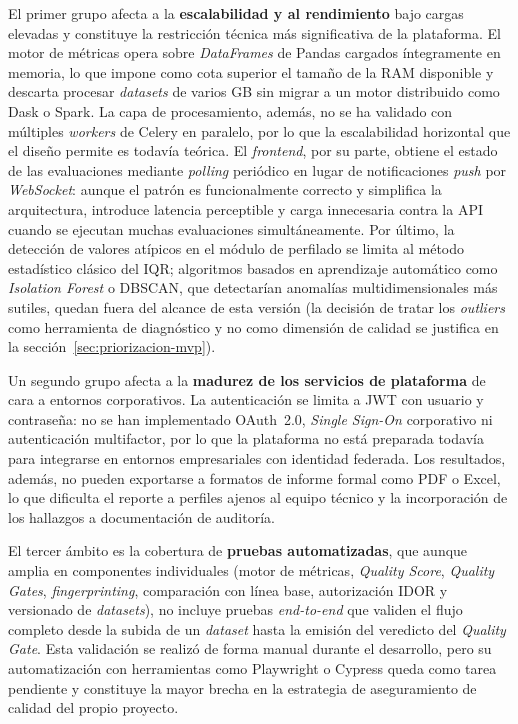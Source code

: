 El primer grupo afecta a la \textbf{escalabilidad y al rendimiento} bajo
cargas elevadas y constituye la restricción técnica más significativa de
la plataforma.  El motor de métricas opera sobre \emph{DataFrames} de
Pandas cargados íntegramente en memoria, lo que impone como cota
superior el tamaño de la RAM disponible y descarta procesar
\emph{datasets} de varios GB sin migrar a un motor distribuido como Dask
o Spark.  La capa de procesamiento, además, no se ha validado con
múltiples \emph{workers} de Celery en paralelo, por lo que la
escalabilidad horizontal que el diseño permite es todavía teórica.  El
\emph{frontend}, por su parte, obtiene el estado de las evaluaciones
mediante \emph{polling} periódico en lugar de notificaciones \emph{push}
por \emph{WebSocket}: aunque el patrón es funcionalmente correcto y
simplifica la arquitectura, introduce latencia perceptible y carga
innecesaria contra la \ac{API} cuando se ejecutan muchas evaluaciones
simultáneamente.  Por último, la detección de valores atípicos en el
módulo de perfilado se limita al método estadístico clásico del
\ac{IQR}; algoritmos basados en aprendizaje automático como
\emph{Isolation Forest} o \ac{DBSCAN}, que detectarían anomalías
multidimensionales más sutiles, quedan fuera del alcance de esta versión
(la decisión de tratar los \emph{outliers} como herramienta de
diagnóstico y no como dimensión de calidad se justifica en la
sección~\ref{sec:priorizacion-mvp}).

Un segundo grupo afecta a la \textbf{madurez de los servicios de
plataforma} de cara a entornos corporativos.  La autenticación se limita
a \ac{JWT} con usuario y contraseña: no se han implementado OAuth~2.0,
\emph{Single Sign-On} corporativo ni autenticación multifactor, por lo
que la plataforma no está preparada todavía para integrarse en entornos
empresariales con identidad federada.  Los resultados, además, no pueden
exportarse a formatos de informe formal como \ac{PDF} o Excel, lo que
dificulta el reporte a perfiles ajenos al equipo técnico y la
incorporación de los hallazgos a documentación de auditoría.

El tercer ámbito es la cobertura de \textbf{pruebas automatizadas}, que
aunque amplia en componentes individuales (motor de métricas,
\emph{Quality Score}, \emph{Quality Gates}, \emph{fingerprinting},
comparación con línea base, autorización \ac{IDOR} y versionado de
\emph{datasets}), no incluye pruebas \emph{end-to-end} que validen el
flujo completo desde la subida de un \emph{dataset} hasta la emisión del
veredicto del \emph{Quality Gate}.  Esta validación se realizó de forma
manual durante el desarrollo, pero su automatización con herramientas
como Playwright o Cypress queda como tarea pendiente y constituye la
mayor brecha en la estrategia de aseguramiento de calidad del propio
proyecto.

